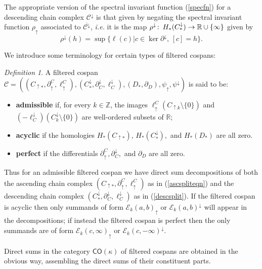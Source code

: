 \documentclass[11pt]{amsart}
\theoremstyle{definition}
\theoremstyle{remark}
\newtheorem{dfn}[theorem]{Definition}
\numberwithin{equation}{section}
\def\co{\colon\thinspace}
\def\R{\mathbb{R}}
\def\Z{\mathbb{Z}}
\begin{document}
The appropriate version of the spectral invariant function (\ref{specfn}) for a descending chain complex $\mathcal{C}^{\downarrow}$ is that given by negating the spectral invariant function $\rho_{\uparrow}$ associated to $\overline{\mathcal{C}^{\downarrow}}$, \emph{i.e.} it is the map $\rho^{\downarrow}\co H_*(C^{\downarrow}_{*})\to\R\cup\{\infty\}$ given by \begin{equation}\label{specdown} \rho^{\downarrow}(h)=\sup\{\ell(c)|c\in\ker\partial^{\downarrow},\,[c]=h\}.\end{equation} 

We introduce some terminology for certain types of filtered cospans:
\begin{dfn}\label{admdef}
	A filtered cospan $\mathcal{C}=\left((C_{\uparrow *},\partial_{\uparrow}^C,\ell_{\uparrow}^C),(C^{\downarrow}_{*},\partial^{\downarrow}_C,\ell^{\downarrow}_C),(D_*,\partial_D),\psi_{\uparrow},\psi^{\downarrow}\right)$ is said to be:\begin{itemize}\item[(i)] \textbf{admissible} if, for every $k\in \Z$, the images $\ell_{\uparrow}^{C}(C_{\uparrow k}\setminus \{0\})$ and $(-\ell^{\downarrow}_{C})(C^{\downarrow}_{k}\setminus\{0\})$ are well-ordered subsets of $\mathbb{R}$;
		\item[(ii)] \textbf{acyclic} if the homologies $H_*(C_{\uparrow *})$, $H_*(C^{\downarrow}_{*}),$ and $H_*(D_*)$ are all zero.
		\item[(iii)] \textbf{perfect} if the differentials $\partial_{\uparrow}^{C},\partial^{\downarrow}_{C},$ and $\partial_D$ are all zero. \end{itemize}
\end{dfn}

Thus for an admissible filtered cospan we have direct sum decompositions of both the ascending chain complex $(C_{\uparrow *},\partial_{\uparrow}^C,\ell_{\uparrow}^C)$ as in (\ref{ascspliteqn}) and the descending chain complex $(C^{\downarrow}_{*},\partial^{\downarrow}_C,\ell^{\downarrow}_C)$ as in (\ref{descsplit}).  If the filtered cospan is acyclic then only summands of form $\mathcal{E}_{k}(a,b)_{\uparrow}$ or $\mathcal{E}_k(a,b)^{\downarrow}$ will appear in the decompositions; if instead the filtered cospan is perfect then the only summands are of form $\mathcal{E}_k(c,\infty)_{\uparrow}$ or $\mathcal{E}_k(c,-\infty)^{\downarrow}$.



Direct sums in the category $\mathsf{CO}(\kappa)$ of filtered cospans are obtained in the obvious way, assembling the direct sums of their constituent parts. %
\end{document}
